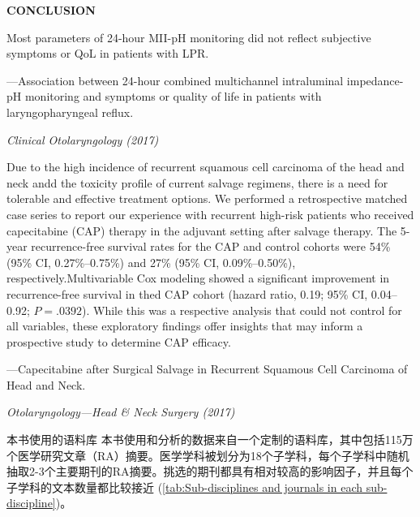 \documentclass[a4paper]{ctexbook}
\begin{document}
\begin{sample}[label={myautocounter}]{\heiti}
  \textbf{CONCLUSION} 

  Most parameters of 24-hour MII-pH monitoring did not reflect subjective symptoms or QoL in patients with LPR.

  \begin{flushright}
    ---Association between 24-hour combined multichannel intraluminal impedance-pH monitoring and symptoms or quality of life in patients with laryngopharyngeal reflux. 
    
    \emph{Clinical Otolaryngology (2017)}
  \end{flushright}

  
\end{sample}

\begin{sample}[label={myautocounter}]{\heiti}
  Due to the high incidence of recurrent squamous cell carcinoma of the head and neck andd the toxicity profile of current salvage regimens, there is a need for tolerable and effective treatment options. We performed a retrospective matched case series to report our experience with recurrent high-risk patients who received capecitabine (CAP) therapy in the adjuvant setting after salvage therapy. The 5-year recurrence-free survival rates for the CAP and control cohorts were 54\% (95\% CI, 0.27\%--0.75\%) and 27\% (95\% CI, 0.09\%--0.50\%), respectively.Multivariable Cox modeling showed a significant improvement in recurrence-free survival in thed CAP cohort (hazard ratio, 0.19; 95\% CI, 0.04--0.92; $P=.0 392$). While this was a respective analysis that could not control for all variables, these exploratory findings offer insights that may inform a prospective study to determine CAP efficacy.
  
  \begin{flushright}
    ---Capecitabine after Surgical Salvage in Recurrent Squamous Cell Carcinoma of Head and Neck. 
    
    \emph{Otolaryngology---Head \& Neck Surgery (2017)}
  \end{flushright}


\end{sample}

\begin{note}[label={myautocounter}]{\heiti 本书使用的语料库}
  本书使用和分析的数据来自一个定制的语料库，其中包括115万个医学研究文章（RA）摘要。医学学科被划分为18个子学科，每个子学科中随机抽取2-3个主要期刊的RA摘要。挑选的期刊都具有相对较高的影响因子，并且每个子学科的文本数量都比较接近 (\autoref{tab:Sub-disciplines and journals in each sub-discipline})。

\end{note}
\end{document}
